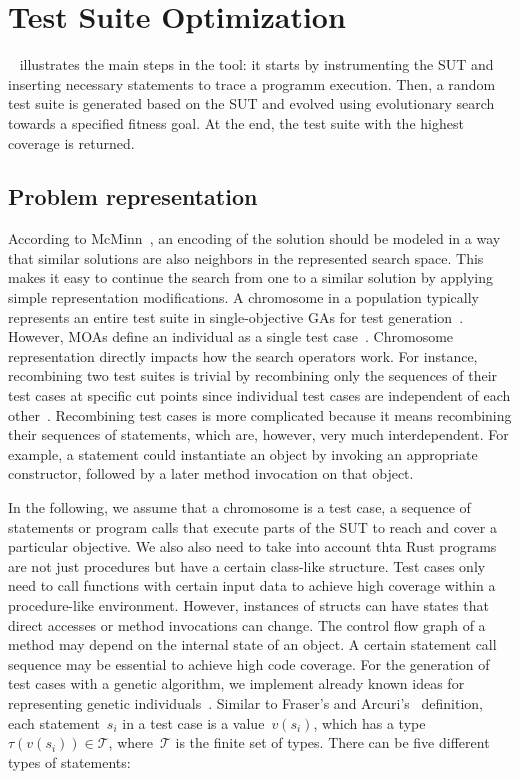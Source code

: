 \documentclass[paper=a4,%
  twoside,%
  BCOR4mm,%
  abstract=true,%
  toc=bibliography,%
  chapterprefix=true,%
  toc=bibliographynumbered,%
  open=right,%
  english,%
  pagesize=pdftex]{scrreprt}
\begin{document}
\section{Test Suite Optimization}
~ illustrates the main steps in the tool: it starts by instrumenting the \ac{SUT} and inserting necessary statements to trace a programm execution. Then, a random test suite is generated based on the \ac{SUT} and evolved using evolutionary search towards a specified fitness goal. At the end, the test suite with the highest coverage is returned.

\subsection{Problem representation}
\label{sec:problem-representation}
According to McMinn~\cite{McMinn_2004}, an encoding of the solution should be modeled in a way that similar solutions are also neighbors in the represented search space. This makes it easy to continue the search from one to a similar solution by applying simple representation modifications. A chromosome in a population typically represents an entire test suite in single-objective \acp{GA} for test generation~\cite{Fraser_2011a, Campos2017}. However, \acp{MOA} define an individual as a single test case~\cite{Panichella2018}. Chromosome representation directly impacts how the search operators work. For instance, recombining two test suites is trivial by recombining only the sequences of their test cases at specific cut points since individual test cases are independent of each other~\cite{Fraser_2013}. Recombining test cases is more complicated because it means recombining their sequences of statements, which are, however, very much interdependent. For example, a statement could instantiate an object by invoking an appropriate constructor, followed by a later method invocation on that object. 

In the following, we assume that a chromosome is a test case, a sequence of statements or program calls that execute parts of the \ac{SUT} to reach and cover a particular objective. We also also need to take into account thta Rust programs are not just procedures but have a certain class-like structure. Test cases only need to call functions with certain input data to achieve high coverage within a procedure-like environment. However, instances of structs can have states that direct accesses or method invocations can change. The control flow graph of a method may depend on the internal state of an object. A certain statement call sequence may be essential to achieve high code coverage. For the generation of test cases with a genetic algorithm, we implement already known ideas for representing genetic individuals~\cite{Fraser2012,Tonella2004,Arcuri2008}. Similar to Fraser's and Arcuri's~\cite{Fraser_2011a} definition, each statement~$s_i$ in a test case is a value~$v(s_i)$, which has a type~$\tau(v(s_i)) \in \mathcal{T}$, where~$\mathcal{T}$ is the finite set of types. There can be five different types of statements:
\end{document}
